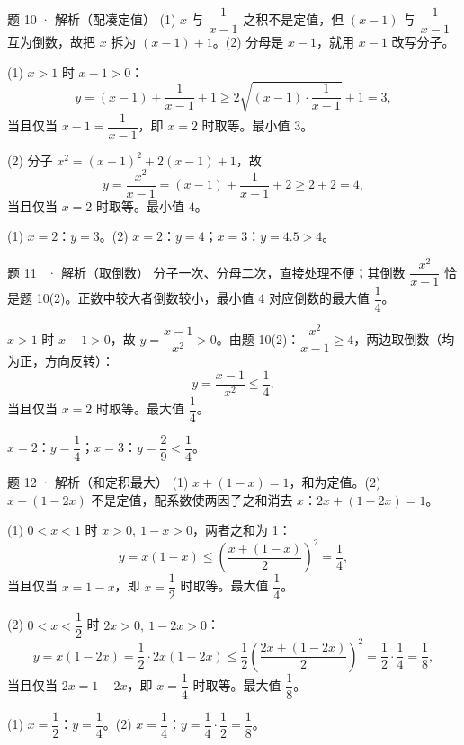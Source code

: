 \begin{solution}{题 10 · 解析（配凑定值）}
\think (1) $x$ 与 $\dfrac1{x-1}$ 之积不是定值，但 $(x-1)$ 与 $\dfrac{1}{x-1}$ 互为倒数，故把 $x$ 拆为 $(x-1)+1$。(2) 分母是 $x-1$，就用 $x-1$ 改写分子。

\solve (1) $x>1$ 时 $x-1>0$：
\[
y=(x-1)+\frac{1}{x-1}+1\ge 2\sqrt{(x-1)\cdot\frac{1}{x-1}}+1=3,
\]
当且仅当 $x-1=\dfrac1{x-1}$，即 $x=2$ 时取等。最小值 $3$。

(2) 分子 $x^2=(x-1)^2+2(x-1)+1$，故
\[
y=\frac{x^2}{x-1}=(x-1)+\frac{1}{x-1}+2\ge 2+2=4,
\]
当且仅当 $x=2$ 时取等。最小值 $4$。

\checkup (1) $x=2$：$y=3$。(2) $x=2$：$y=4$；$x=3$：$y=4.5>4$。

\end{solution}

\begin{solution}{题 11 \starred\ · 解析（取倒数）}
\think 分子一次、分母二次，直接处理不便；其倒数 $\dfrac{x^2}{x-1}$ 恰是题 10(2)。正数中较大者倒数较小，最小值 4 对应倒数的最大值 $\dfrac14$。

\solve $x>1$ 时 $x-1>0$，故 $y=\dfrac{x-1}{x^2}>0$。由题 10(2)：$\dfrac{x^2}{x-1}\ge 4$，两边取倒数（均为正，方向反转）：
\[
y=\frac{x-1}{x^2}\le\frac14,
\]
当且仅当 $x=2$ 时取等。最大值 $\dfrac14$。

\checkup $x=2$：$y=\dfrac{1}{4}$；$x=3$：$y=\dfrac29<\dfrac14$。

\end{solution}

\begin{solution}{题 12 · 解析（和定积最大）}
\think (1) $x+(1-x)=1$，和为定值。(2) $x+(1-2x)$ 不是定值，配系数使两因子之和消去 $x$：$2x+(1-2x)=1$。

\solve (1) $0<x<1$ 时 $x>0,\ 1-x>0$，两者之和为 1：
\[
y=x(1-x)\le\left(\frac{x+(1-x)}{2}\right)^2=\frac14,
\]
当且仅当 $x=1-x$，即 $x=\dfrac12$ 时取等。最大值 $\dfrac14$。

(2) $0<x<\dfrac12$ 时 $2x>0,\ 1-2x>0$：
\[
y=x(1-2x)=\frac12\cdot 2x(1-2x)\le\frac12\left(\frac{2x+(1-2x)}{2}\right)^2=\frac12\cdot\frac14=\frac18,
\]
当且仅当 $2x=1-2x$，即 $x=\dfrac14$ 时取等。最大值 $\dfrac18$。

\checkup (1) $x=\dfrac12$：$y=\dfrac14$。(2) $x=\dfrac14$：$y=\dfrac14\cdot\dfrac12=\dfrac18$。

\end{solution}

